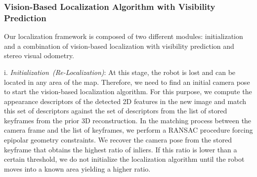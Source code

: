 \subsubsection{Vision-Based Localization Algorithm with Visibility Prediction}\label{sec:vision_algorithm}
Our localization framework is composed of two different modules: initialization and a combination of vision-based localization with visibility prediction and stereo visual odometry. 

i. \textit{Initialization~(Re-Localization)}: At this stage, the robot is lost and can be located in any area of the map. Therefore, we need to find an initial camera pose to start the vision-based localization algorithm. For this purpose, we compute the appearance descriptors of the detected 2D features in the new image and match this set of descriptors against the set of descriptors from the list of stored keyframes from the prior 3D reconstruction. In the matching process between the camera frame and the list of keyframes, we perform a RANSAC procedure forcing epipolar geometry constraints. We recover the camera pose from the stored keyframe that obtains the highest ratio of inliers. If this ratio is lower than a certain threshold, we do not initialize the localization algorithm until the robot moves into a known area yielding a higher ratio.

